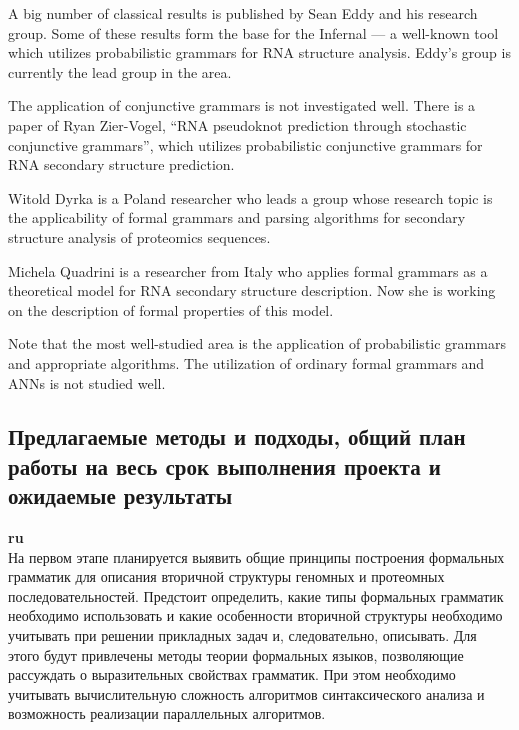 \documentclass[12pt]{article}  %
\theoremstyle{remark}
\begin{document}
A big number of classical results is published by Sean Eddy and his research group. Some of these results form the base for the Infernal --- a well-known tool which utilizes probabilistic grammars for RNA structure analysis. Eddy's group is currently the lead group in the area.

The application of conjunctive grammars is not investigated well. There is a paper of  Ryan Zier-Vogel, ``RNA pseudoknot prediction through stochastic conjunctive grammars'', which utilizes probabilistic conjunctive grammars for RNA secondary structure prediction.

Witold Dyrka is a Poland researcher who leads a group whose research topic is the applicability of formal grammars and parsing algorithms for secondary structure analysis of proteomics sequences.

Michela Quadrini is a researcher from Italy who applies formal grammars as a theoretical model for RNA secondary structure description. Now she is working on the description of formal properties of this model.

Note that the most well-studied area is the application of probabilistic grammars and appropriate algorithms.
The utilization of ordinary formal grammars and ANNs is not studied well.

\subsection{Предлагаемые методы и подходы, общий план работы на весь срок выполнения проекта и ожидаемые результаты }

\textbf{ru}\\
На первом этапе планируется выявить общие принципы построения формальных грамматик для описания вторичной структуры геномных и протеомных последовательностей.
Предстоит определить, какие типы формальных грамматик необходимо использовать и какие особенности вторичной структуры необходимо учитывать при решении прикладных задач и, следовательно, описывать.
Для этого будут привлечены методы теории формальных языков, позволяющие рассуждать о выразительных свойствах грамматик.
При этом необходимо учитывать вычислительную сложность алгоритмов синтаксического анализа и возможность реализации параллельных алгоритмов.
\end{document}
